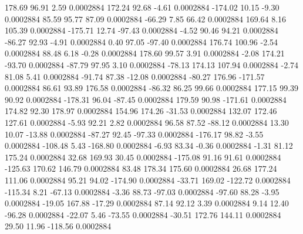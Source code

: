       178.69       96.91        2.59     0.0002884
      172.24       92.68       -4.61     0.0002884
     -174.02       10.15       -9.30     0.0002884
       85.59       95.77       87.09     0.0002884
      -66.29        7.85       66.42     0.0002884
      169.64        8.16      105.39     0.0002884
     -175.71       12.74      -97.43     0.0002884
       -4.52       90.46       94.21     0.0002884
      -86.27       92.93       -4.91     0.0002884
        0.40       97.05      -97.40     0.0002884
      176.74      100.96       -2.54     0.0002884
       88.48        6.18       -0.28     0.0002884
      178.60       99.57        3.91     0.0002884
       -2.08      174.21      -93.70     0.0002884
      -87.79       97.95        3.10     0.0002884
      -78.13      174.13      107.94     0.0002884
       -2.74       81.08        5.41     0.0002884
      -91.74       87.38      -12.08     0.0002884
      -80.27      176.96     -171.57     0.0002884
       86.61       93.89      176.58     0.0002884
      -86.32       86.25       99.66     0.0002884
      177.15       99.39       90.92     0.0002884
     -178.31       96.04      -87.45     0.0002884
      179.59       90.98     -171.61     0.0002884
      174.82       92.30      178.97     0.0002884
      154.96      174.26      -31.53     0.0002884
      132.07      172.46      127.61     0.0002884
       -5.93       92.21        2.82     0.0002884
       96.58       87.52      -88.12     0.0002884
       13.30       10.07      -13.88     0.0002884
      -87.27       92.45      -97.33     0.0002884
     -176.17       98.82       -3.55     0.0002884
     -108.48        5.43     -168.80     0.0002884
       -6.93       83.34       -0.36     0.0002884
       -1.31       81.12      175.24     0.0002884
       32.68      169.93       30.45     0.0002884
     -175.08       91.16       91.61     0.0002884
     -125.63      170.62      146.79     0.0002884
       83.48      178.34      175.60     0.0002884
       26.68      177.24      111.06     0.0002884
       95.21       94.02     -174.90     0.0002884
      -33.71      169.02     -122.72     0.0002884
     -115.34        8.21      -67.13     0.0002884
       -3.36       88.73      -97.03     0.0002884
      -97.60       88.28       -3.95     0.0002884
      -19.05      167.88      -17.29     0.0002884
       87.14       92.12        3.39     0.0002884
        9.14       12.40      -96.28     0.0002884
      -22.07        5.46      -73.55     0.0002884
      -30.51      172.76      144.11     0.0002884
       29.50       11.96     -118.56     0.0002884
